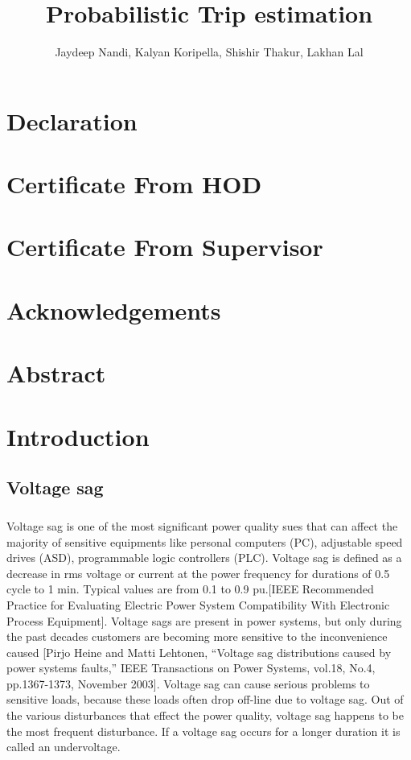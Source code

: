 \documentclass[14pt, a4paper]{extreport}
\title{Probabilistic Trip estimation}
\author{Jaydeep Nandi, Kalyan Koripella, Shishir Thakur, Lakhan Lal}
\begin{document}
	
	\maketitle
	\titleformat{\chapter}[display]{\normalfont\bfseries}{}{0pt}{\Large}
	\setcounter{page}{1}
	\tableofcontents
	\chapter[Declaration]{Declaration}
	\setcounter{page}{1}
	
	\newpage
	\chapter[Certificate from HOD]{Certificate From HOD}
	\chapter[Certificate from Supervisor]{Certificate From Supervisor}		
	\chapter[Acknowledgements]{Acknowledgements}
	\chapter[Abstract]{Abstract}
	\newpage
	
	
	\chapter[Introduction]{Introduction}
	\setcounter{page}{1}
\section[Voltage sag]{Voltage sag}
\paragraph{}
Voltage sag is one of the most significant power quality sues that can affect the majority of sensitive equipments like personal computers (PC), adjustable speed drives (ASD), programmable logic controllers (PLC). Voltage sag is defined as a decrease in rms voltage or current at the power frequency for durations of 0.5 cycle to 1 min. Typical values are from 0.1 to 0.9 pu.[IEEE Recommended Practice for Evaluating Electric Power System Compatibility With Electronic Process Equipment]. Voltage sags are present in power systems, but only during the past decades customers are becoming more sensitive to the inconvenience caused [Pirjo Heine and Matti Lehtonen, “Voltage sag distributions caused by power systems faults,” IEEE Transactions on Power Systems, vol.18, No.4, pp.1367-1373, November 2003]. Voltage sag can cause serious problems to sensitive loads, because these loads often drop off-line due to voltage sag. Out of the various disturbances that effect the power quality, voltage sag happens to be the most frequent disturbance. If a voltage sag occurs for a longer duration it is called an undervoltage. 
\end{document}
